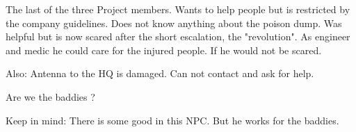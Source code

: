 \begin{npcBox}[title=Name]
    \begin{consequences}
    \item {}
    \item {}
    \item {}
    \end{consequences}
    
    \begin{npcDescription}
    The last of the three Project members. Wants to help people but is restricted by the company guidelines. Does not know anything about the poison dump. Was helpful but is now scared after the short escalation, the "revolution". As engineer and medic he could care for the injured people. If he would not be scared.

    Also: Antenna to the HQ is damaged. Can not contact and ask for help.
    
    Are we the baddies ?
    
    Keep in mind: There is some good in this NPC. But he works for the baddies.
    \end{npcDescription}
    
\end{npcBox}



